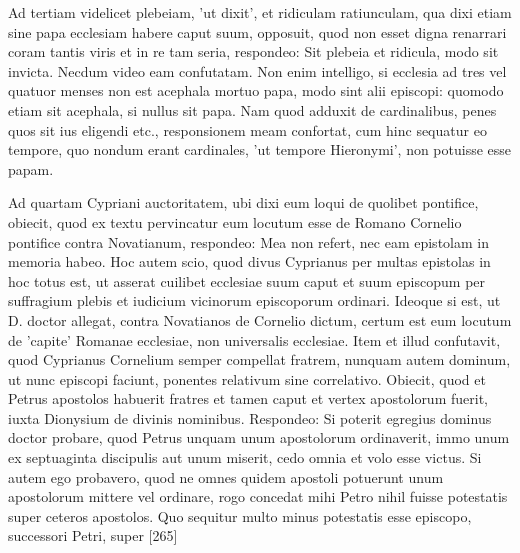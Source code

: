 Ad tertiam videlicet plebeiam, 'ut dixit', et ridiculam ratiunculam, qua dixi etiam sine papa ecclesiam habere caput suum, opposuit, quod non esset digna renarrari coram tantis viris et in re tam seria, respondeo: Sit plebeia et ridicula, modo sit invicta. Necdum video eam confutatam. Non enim intelligo, si ecclesia ad tres vel quatuor menses non est acephala mortuo papa, modo sint alii episcopi: quomodo etiam sit acephala, si nullus sit papa. Nam quod adduxit de cardinalibus, penes quos sit ius eligendi etc., responsionem meam confortat, cum hinc sequatur eo tempore, quo nondum erant cardinales, 'ut tempore Hieronymi', non potuisse esse papam.

Ad quartam Cypriani auctoritatem, ubi dixi eum loqui de quolibet pontifice, obiecit, quod ex textu pervincatur eum locutum esse de Romano Cornelio pontifice contra Novatianum, respondeo: Mea non refert, nec eam epistolam in memoria habeo. Hoc autem scio, quod divus Cyprianus per multas epistolas in hoc totus est, ut asserat cuilibet ecclesiae suum caput et suum episcopum per suffragium plebis et iudicium vicinorum episcoporum ordinari. Ideoque si est, ut D. doctor allegat, contra Novatianos de Cornelio dictum, certum est eum locutum de 'capite' Romanae ecclesiae, non universalis ecclesiae. Item et illud confutavit, quod Cyprianus Cornelium semper compellat fratrem, nunquam autem dominum, ut nunc episcopi faciunt, ponentes relativum sine correlativo. Obiecit, quod et Petrus apostolos habuerit fratres et tamen caput et vertex apostolorum fuerit, iuxta Dionysium de divinis nominibus. Respondeo: Si poterit egregius dominus doctor probare, quod Petrus unquam unum apostolorum ordinaverit, immo unum ex septuaginta discipulis aut unum miserit, cedo omnia et volo esse victus. Si autem ego probavero, quod ne omnes quidem apostoli potuerunt unum apostolorum mittere vel ordinare, rogo concedat mihi Petro nihil fuisse potestatis super ceteros apostolos. Quo sequitur multo minus potestatis esse episcopo, successori Petri, super [265]

